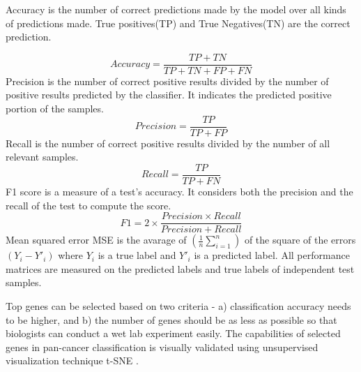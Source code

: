 \documentclass{bioinfo}
\begin{document}
Accuracy is the number of correct predictions made by the model over all kinds of predictions made. True positives(TP) and True Negatives(TN) are the correct prediction. 

    \begin{equation}
        Accuracy = \frac{TP+TN}{TP+TN+FP+FN}
    \end{equation}
    Precision is the number of correct positive results divided by the number of positive results predicted by the classifier. It indicates the predicted positive portion of the samples. 
    \begin{equation}
        Precision = \frac{TP}{TP+FP}
    \end{equation}
    Recall is the number of correct positive results divided by the number of all relevant samples.
    \begin{equation}
        Recall = \frac{TP}{TP+FN}
    \end{equation}
	F1 score is a measure of a test's accuracy. It considers both the precision and the recall of the test to compute the score.
	\begin{equation}
        F1 = 2 \times \frac{Precision \times Recall}{Precision + Recall}
    \end{equation}
    Mean squared error MSE is the avarage of $(\frac{1}{n} \sum _{i=1} ^n)$ of the square of the errors $(Y_i - Y'_i)$ where $Y_i$ is a true label and $Y'_i$ is a predicted label. All performance matrices are measured on the predicted labels and true labels of independent test samples. 

Top genes can be selected based on two criteria - a) classification accuracy needs to be higher,
and b) the number of genes should be as less as possible so that biologists can conduct a wet lab experiment
easily. The capabilities of selected genes in pan-cancer classification is visually validated using unsupervised visualization technique t-SNE \citep{maaten2008visualizing}.
\end{document}
